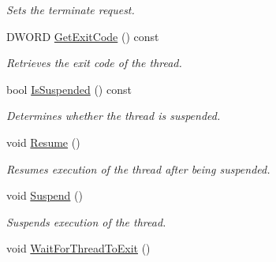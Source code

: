 \begin{DoxyCompactItemize}
\begin{DoxyCompactList}\small\item\em Sets the terminate request. \item\end{DoxyCompactList}\item 
DWORD \hyperlink{class_thread_single_a08b4ac536ac97fef18a07d6593bb5cbf}{GetExitCode} () const 
\begin{DoxyCompactList}\small\item\em Retrieves the exit code of the thread. \item\end{DoxyCompactList}\item 
bool \hyperlink{class_thread_single_af6dea116ccb56256a743fbaad5223f1d}{IsSuspended} () const 
\begin{DoxyCompactList}\small\item\em Determines whether the thread is suspended. \item\end{DoxyCompactList}\item 
void \hyperlink{class_thread_single_a5eabc758672cb08b0109d9115b4d2b30}{Resume} ()
\begin{DoxyCompactList}\small\item\em Resumes execution of the thread after being suspended. \item\end{DoxyCompactList}\item 
void \hyperlink{class_thread_single_afac6eb8f03eba7b9b4773e57b817eb1f}{Suspend} ()
\begin{DoxyCompactList}\small\item\em Suspends execution of the thread. \item\end{DoxyCompactList}\item 
\hypertarget{class_thread_single_a06243d993bb3951de1c90b531fe51f28}{
void \hyperlink{class_thread_single_a06243d993bb3951de1c90b531fe51f28}{WaitForThreadToExit} ()}
\label{class_thread_single_a06243d993bb3951de1c90b531fe51f28}


\end{DoxyCompactItemize}
